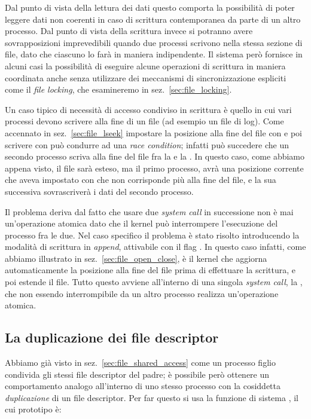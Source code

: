 Dal punto di vista della lettura dei dati questo comporta la possibilità di
poter leggere dati non coerenti in caso di scrittura contemporanea da parte di
un altro processo. Dal punto di vista della scrittura invece si potranno avere
sovrapposizioni imprevedibili quando due processi scrivono nella stessa
sezione di file, dato che ciascuno lo farà in maniera indipendente.  Il
sistema però fornisce in alcuni casi la possibilità di eseguire alcune
operazioni di scrittura in maniera coordinata anche senza utilizzare dei
meccanismi di sincronizzazione espliciti come il \textit{file locking}, che
esamineremo in sez.~\ref{sec:file_locking}.

Un caso tipico di necessità di accesso condiviso in scrittura è quello in cui
vari processi devono scrivere alla fine di un file (ad esempio un file di
log). Come accennato in sez.~\ref{sec:file_lseek} impostare la posizione alla
fine del file con  e poi scrivere con  può condurre ad
una \textit{race condition}; infatti può succedere che un secondo processo
scriva alla fine del file fra la  e la . In questo
caso, come abbiamo appena visto, il file sarà esteso, ma il primo processo,
avrà una posizione corrente che aveva impostato con  che non
corrisponde più alla fine del file, e la sua successiva 
sovrascriverà i dati del secondo processo.

Il problema deriva dal fatto che usare due \textit{system call} in successione
non è mai un'operazione atomica dato che il kernel può interrompere
l'esecuzione del processo fra le due. Nel caso specifico il problema è stato
risolto introducendo la modalità di scrittura in \textit{append}, attivabile
con il flag . In questo caso infatti, come abbiamo illustrato
in sez.~\ref{sec:file_open_close}, è il kernel che aggiorna automaticamente la
posizione alla fine del file prima di effettuare la scrittura, e poi estende
il file.  Tutto questo avviene all'interno di una singola \textit{system
  call}, la , che non essendo interrompibile da un altro processo
realizza un'operazione atomica.


\subsection{La duplicazione dei file descriptor}
\label{sec:file_dup}

Abbiamo già visto in sez.~\ref{sec:file_shared_access} come un processo figlio
condivida gli stessi file descriptor del padre; è possibile però ottenere un
comportamento analogo all'interno di uno stesso processo con la cosiddetta
\textit{duplicazione} di un file descriptor. Per far questo si usa la funzione
di sistema , il cui prototipo è:

